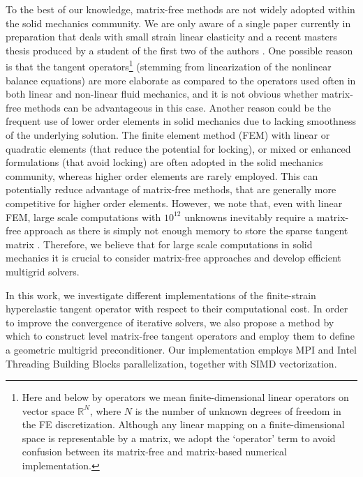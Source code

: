 \documentclass[times,doublespace]{nmeauth}
\begin{document}
To the best of our knowledge, matrix-free methods are not widely adopted within the solid mechanics community.
We are only aware of a single paper currently in preparation that deals with small strain linear elasticity \cite{Clevenger2018} and a recent masters thesis produced by a student of the first two of the authors \cite{Mentler2017}.
One possible reason is that the tangent operators\footnote{{\color{red}Here and
below by operators we mean finite-dimensional linear operators on vector space $\mathbb R^N$, where $N$ is the number of unknown degrees of freedom in the FE discretization.
Although any linear mapping on a finite-dimensional space is representable by a matrix, we adopt the `operator' term to avoid confusion between its matrix-free and matrix-based numerical implementation.
}} (stemming from linearization of the nonlinear balance equations) are
more elaborate as compared to the operators used often in both linear and non-linear fluid mechanics, and it is not obvious whether matrix-free methods can be advantageous in this case.
Another reason could be the {\color{red}frequent} use of lower order elements in solid mechanics due to lacking smoothness of the underlying solution.
The finite element method (FEM) with linear or quadratic elements (that reduce the potential for locking), or mixed or enhanced formulations (that avoid locking) are often adopted in the solid mechanics community,
{\color{red}whereas} higher order elements are rarely employed.
{\color{red}
This can potentially reduce advantage of matrix-free methods, that are generally more competitive for higher order elements.
}
However, we note that, even with linear FEM, large scale computations with $10^{12}$ unknowns inevitably require a matrix-free approach as there is simply not enough memory to store the sparse tangent matrix \cite{Gmeiner2016}. Therefore, we believe that for large scale computations in solid mechanics it is crucial to consider matrix-free approaches and develop efficient multigrid solvers.

In this work, we investigate different implementations of the finite-strain hyperelastic tangent operator with respect to their computational cost.
In order to improve the convergence of iterative solvers, we also propose a method by which to construct level matrix-free tangent operators
and employ them to define a \mbox{geometric} multigrid preconditioner.
Our implementation employs MPI and Intel Threading Building Blocks parallelization, together with SIMD vectorization.
\end{document}
